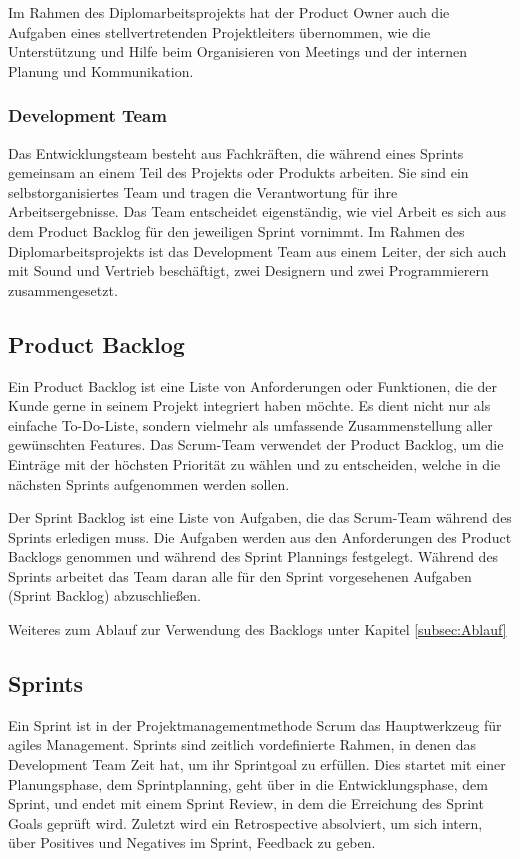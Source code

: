 Im Rahmen des Diplomarbeitsprojekts hat der Product Owner auch die Aufgaben eines stellvertretenden Projektleiters übernommen, wie die Unterstützung und Hilfe beim Organisieren von Meetings und der internen Planung und Kommunikation.
%
\subsubsection{Development Team}\label{subsubsec:Development-Team}
%
Das Entwicklungsteam besteht aus Fachkräften, die während eines Sprints gemeinsam an einem Teil des Projekts oder Produkts arbeiten.
Sie sind ein selbstorganisiertes Team und tragen die Verantwortung für ihre Arbeitsergebnisse.
Das Team entscheidet eigenständig, wie viel Arbeit es sich aus dem Product Backlog für den jeweiligen Sprint vornimmt.
Im Rahmen des Diplomarbeitsprojekts ist das Development Team aus einem Leiter, der sich auch mit Sound und Vertrieb beschäftigt, zwei Designern und zwei Programmierern zusammengesetzt.
%
\subsection{Product Backlog}\label{subsec:product-backlog}
%
Ein Product Backlog ist eine Liste von Anforderungen oder Funktionen, die der Kunde gerne in seinem Projekt integriert haben möchte.
Es dient nicht nur als einfache To-Do-Liste, sondern vielmehr als umfassende Zusammenstellung aller gewünschten Features.
Das Scrum-Team verwendet der Product Backlog, um die Einträge mit der höchsten Priorität zu wählen und zu entscheiden, welche in die nächsten Sprints aufgenommen werden sollen.

Der Sprint Backlog ist eine Liste von Aufgaben, die das Scrum-Team während des Sprints erledigen muss.
Die Aufgaben werden aus den Anforderungen des Product Backlogs genommen und während des Sprint Plannings festgelegt.
Während des Sprints arbeitet das Team daran alle für den Sprint vorgesehenen Aufgaben (Sprint Backlog) abzuschließen.

Weiteres zum Ablauf zur Verwendung des Backlogs unter Kapitel \ref{subsec:Ablauf}
%

\subsection{Sprints}\label{subsec:sprints}
%
Ein Sprint ist in der Projektmanagementmethode Scrum das Hauptwerkzeug für agiles Management.
Sprints sind zeitlich vordefinierte Rahmen, in denen das Development Team Zeit hat, um ihr Sprintgoal zu erfüllen.
Dies startet mit einer Planungsphase, dem Sprintplanning, geht über in die Entwicklungsphase, dem Sprint, und endet mit einem Sprint Review, in dem die Erreichung des Sprint Goals geprüft wird.
Zuletzt wird ein Retrospective absolviert, um sich intern, über Positives und Negatives im Sprint, Feedback zu geben. 
%
